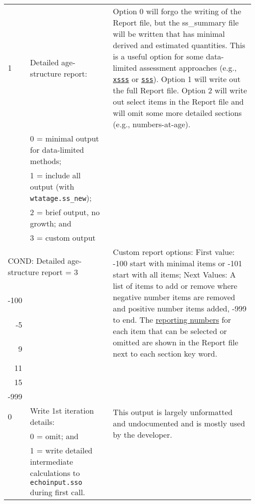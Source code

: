 {\begin{landscape}
\begin{longtable}{p{1.5cm} p{7.2cm} p{12.3cm}}
 \hline
 1 & Detailed age-structure report: & \multirow{1}{12.3cm}[-0.15cm]{\parbox{12.3cm}{Option 0 will forgo the writing of the Report file, but the ss\_summary file will be written that has minimal derived and estimated quantities. This is a useful option for some data-limited assessment approaches (e.g., \href{https://github.com/chantelwetzel-noaa/XSSS}{\texttt{xsss}} or \href{https://github.com/shcaba/SSS}{\texttt{sss}}). Option 1 will write out the full Report file. Option 2 will write out select items in the Report file and will omit some more detailed sections (e.g., numbers-at-age).}} \Tstrut\\
   & 0 = minimal output for data-limited methods; & \\
   & 1 = include all output (with \texttt{wtatage.ss\_new}); & \\
   & 2 = brief output, no growth;  and &  \\	
   & 3 = custom output & \\

\hline
 \multicolumn{2}{l}{COND: Detailed age-structure report = 3} & \multirow{4}{12.3cm}[-0.25cm]{\parbox{12.3cm}{Custom report options: First value: -100 start with minimal items or -101 start with all items; Next Values: A list of items to add or remove where negative number items are removed and positive number items added, -999 to end. The \hyperlink{custom}{reporting numbers} for each item that can be selected or omitted are shown in the Report file next to each section key word.}} \Tstrut\\
 \multicolumn{1}{r}{-100} & & \\
 \multicolumn{1}{r}{  -5} & & \\
 \multicolumn{1}{r}{   9} & & \\
 \multicolumn{1}{r}{  11} & & \\
 \multicolumn{1}{r}{  15} & & \\
 \multicolumn{1}{r}{-999} & & \Bstrut\\
		 
 \hline
 0 & Write 1st iteration details: & \multirow{2}{12.3cm}[-0.25cm]{\parbox{12.3cm}{This output is largely unformatted and undocumented and is mostly used by the developer.}} \Tstrut\\
   & 0 = omit; and & \\
   & 1 = write detailed intermediate calculations to \texttt{echoinput.sso} during first call. & \Bstrut\\


\end{longtable}
\end{landscape}}
